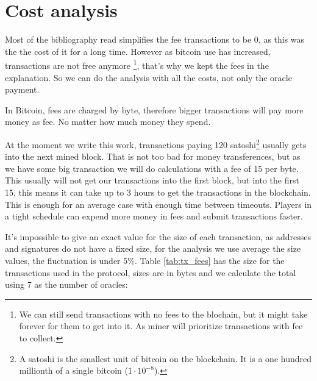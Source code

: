 \section {Cost analysis}
\newcommand\numoracles[0]{7}%
\newcommand\feeval[0]{15}%
\newcommand\bitcoinusd[0]{3800}%
\newcommand\txcost[2]{\calculatecosts{#1}{#2}{\numoracles{}}{\feeval{}}}%
\newcommand\usdcost[1]{\satoshitousd{#1}{\bitcoinusd{}}}%

Most of the bibliography read simplifies the fee transactions to be 0,
  as this was the the cost of it for a long time.
However as bitcoin use has increased, transactions are not free anymore
  \footnote{We can still send transactions with no fees to the blochain, but it
    might take forever for them to get into it. As miner will prioritize
    transactions with fee to collect.}, that's why we kept the fees in the
  explanation.
So we can do the analysis with all the costs, not only the oracle payment.

In Bitcoin, fees are charged by byte, therefore bigger transactions will pay more
  money as fee.
No matter how much money they spend.

At the moment we write this work, transactions paying 120 satoshi\footnote{A
  satoshi is the smallest unit of bitcoin on the blockchain. It is a one hundred
  millionth of a single bitcoin ($1 \cdot 10^{-8}$).} usually gets into the next
  mined block.
That is not too bad for money transferences, but as we have some big transaction
  we will do calculations with a fee of \feeval{} per byte.
This usually will not get our transactions into the first block, but into the
  first 15, this means it can take up to 3 hours to get the transactions in
  the blockchain.
This is enough for an average case with enough time between timeouts.
Players in a tight schedule can expend more money in fees and submit
  transactions faster.

It's impossible to give an exact value for the size of each transaction, as
  addresses and signatures do not have a fixed size, for the analysis we use
  average the size values, the fluctuation is under 5\%.
Table \ref{tab:tx_fees} has the size for the transactions used in the protocol,
  sizes are in bytes and we calculate the total using \numoracles{} as the number
  of oracles:

